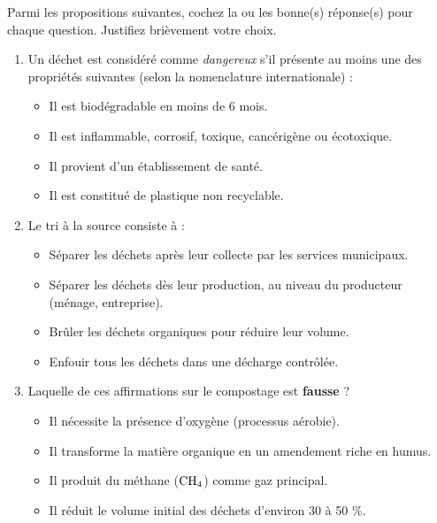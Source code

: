 \documentclass[11pt]{article}
\begin{document}
\begin{exercice}
Parmi les propositions suivantes, cochez la ou les bonne(s) réponse(s) pour chaque question. Justifiez brièvement votre choix.

\begin{enumerate}
    \item Un déchet est considéré comme \emph{dangereux} s'il présente au moins une des propriétés suivantes (selon la nomenclature internationale) :
    \begin{itemize}
        \item[A.] Il est biodégradable en moins de 6 mois.
        \item[B.] Il est inflammable, corrosif, toxique, cancérigène ou écotoxique.
        \item[C.] Il provient d'un établissement de santé.
        \item[D.] Il est constitué de plastique non recyclable.
    \end{itemize}

    \item Le tri à la source consiste à :
    \begin{itemize}
        \item[A.] Séparer les déchets après leur collecte par les services municipaux.
        \item[B.] Séparer les déchets dès leur production, au niveau du producteur (ménage, entreprise).
        \item[C.] Brûler les déchets organiques pour réduire leur volume.
        \item[D.] Enfouir tous les déchets dans une décharge contrôlée.
    \end{itemize}

    \item Laquelle de ces affirmations sur le compostage est \textbf{fausse} ?
    \begin{itemize}
        \item[A.] Il nécessite la présence d'oxygène (processus aérobie).
        \item[B.] Il transforme la matière organique en un amendement riche en humus.
        \item[C.] Il produit du méthane ($\ce{CH4}$) comme gaz principal.
        \item[D.] Il réduit le volume initial des déchets d'environ 30 à 50 \%. 
    \end{itemize}
\end{enumerate}
\end{exercice}
\end{document}
